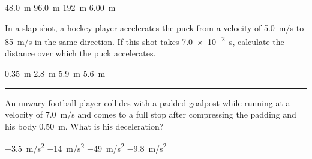 \documentclass[]{exam}
\theoremstyle{definition}
\begin{document}
\begin{questions}
\begin{choices}
\choice \SI{48.0}{m}
\choice \SI{96.0}{m}
\correctchoice \SI{192}{m}
\choice \SI{6.00}{m}
\end{choices}






%
\question %
In a slap shot, a hockey player accelerates the puck from a velocity of \SI{5.0}{m/s} to \SI{85}{m/s} in the same direction. If this shot takes \SI{7.0e-2}{s}, calculate the distance over which the puck accelerates.

\begin{choices}
\choice \SI{0.35}{m}
\correctchoice \SI{2.8}{m}
\choice \SI{5.9}{m}
\choice \SI{5.6}{m}
\end{choices}









\vspace{1em}
\hrule

\question %
An unwary football player collides with a padded goalpost while running at a velocity of \SI{7.0}{m/s} and comes to a full stop after compressing the padding and his body \SI{0.50}{m}. What is his deceleration?

\begin{choices}
\choice \SI{-3.5}{m/s^2}
\choice \SI{-14}{m/s^2}
\correctchoice \SI{-49}{m/s^2}
\choice \SI{-9.8}{m/s^2}
\end{choices}


\end{questions}
\end{document}
